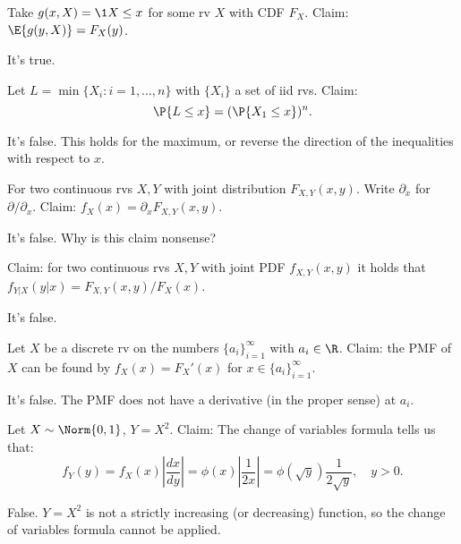\documentclass[tf-tutorial-all.tex]{subfiles}
\begin{document}
\begin{truefalse}
Take $g(x, X) = \1{X\leq x}$ for some rv $X$ with CDF $F_{X}$. Claim: $\E{g(y, X)} = F_{X}(y)$.
\begin{solution}
It's true.
\end{solution}
\end{truefalse}




\begin{truefalse}
Let $L = \min\{X_{i} : i =1, \ldots, n\}$ with $\{X_{i}\}$ a set of iid rvs.
Claim:
\begin{equation}
\P{L\leq x} = (\P{X_{1} \leq x})^{n}.
\end{equation}
\begin{solution}
It's false. This holds for the maximum, or reverse the direction of the inequalities with respect to $x$.
\end{solution}
\end{truefalse}

\begin{truefalse}
For two continuous rvs $X, Y$ with joint distribution $F_{X,Y}(x,y)$. Write $\partial_{x}$ for $\partial/ \partial_{x}$.
Claim: $f_{X}(x) = \partial_{x} F_{X,Y}(x,y)$.
\begin{solution}
It's false. Why is this claim nonsense?
\end{solution}
\end{truefalse}

\begin{truefalse}
Claim: for two continuous rvs $X, Y$ with joint PDF $f_{X,Y}(x,y)$ it holds that $f_{Y|X}(y|x) = F_{X,Y}(x,y)/F_{X}(x)$.
\begin{solution}
It's false.
\end{solution}
\end{truefalse}

\begin{truefalse}
Let $X$ be a discrete rv on the numbers $\{a_{i}\}_{i=1}^{\infty}$ with $a_{i} \in \R$.
Claim: the PMF of $X$ can be found by $f_{X}(x) = F_{X}'(x)$ for $x\in \{a_{i}\}_{i=1}^{\infty}$.
\begin{solution}
It's false. The PMF does not have a derivative (in the proper sense) at $a_{i}$.
\end{solution}
\end{truefalse}

\begin{truefalse}
    Let $X \sim \Norm{0,1}$, $Y=X^2$. Claim: The change of variables formula tells us that:
    $$f_Y(y)=f_X(x)\left|\frac{dx}{dy}\right|=\phi(x)\left|\frac{1}{2x}\right|=\phi(\sqrt{y})\frac{1}{2\sqrt{y}},\quad y>0.$$
\begin{solution}
        False. $Y=X^2$ is not a strictly increasing (or decreasing) function, so the change of variables formula cannot be applied.
\end{solution}
\end{truefalse}
\end{document}
